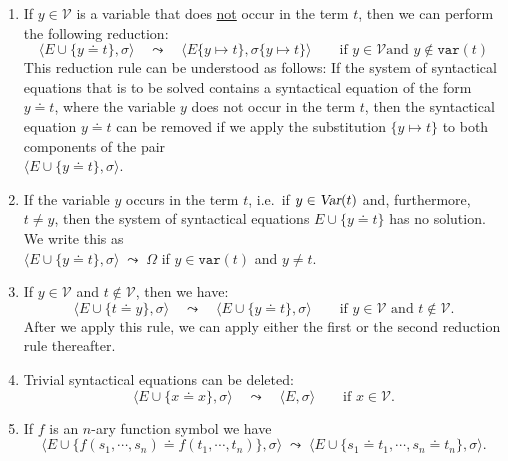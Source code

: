\begin{enumerate}
\item If  $y\in\mathcal{V}$ is a variable that does  \underline{\color{red}not} occur in the term $t$, then
      we can perform the following reduction: 
      \[ \Big\langle E \cup \big\{ y \doteq t \big\}, \sigma \Big\rangle \quad\leadsto\quad 
         \Big\langle E\{y \mapsto t\}, \sigma\{ y \mapsto t \} \Big\rangle \qquad\mbox{if $y \in \mathcal{V}$
           and $y \not\in \mathtt{var}(t)$} 
      \]
      This reduction rule can be understood as follows: If the system of syntactical equations that is to be
      solved contains a syntactical equation of the form $y \doteq t$, where the variable $y$ does not occur in
      the term $t$, then the syntactical equation $y \doteq t$ can be removed if we apply the substitution
      $\{ y \mapsto t \}$ to both components of the pair
      \\[0.2cm]
      \hspace*{1.3cm}
      $\Big\langle E \cup \big\{ y \doteq t \big\}, \sigma \Big\rangle$.
\item If the variable $y$ occurs in the term $t$, i.e.~if  $y \in \textsl{Var}(t)$
      and, furthermore, $t \not= y$, then the system of syntactical equations
      $E \cup \big\{ y \doteq t \big\}$ has no solution.  We write this as
      \\[0.2cm]
      \hspace*{1.3cm}
      $\Big\langle E \cup \big\{ y \doteq t \big\}, \sigma \Big\rangle\;\leadsto\; \Omega$ \quad
      if $y \in \texttt{var}(t)$ and $y \not=t$.
\item If $y\in\mathcal{V}$ and  $t \not\in \mathcal{V}$, then we have:
      \[ \Big\langle E \cup \big\{ t \doteq y \big\}, \sigma \Big\rangle \quad\leadsto\quad 
         \Big\langle E \cup \big\{ y \doteq t \big\}, \sigma \Big\rangle \qquad\mbox{if $y \in \mathcal{V}$ and
           $t \not\in \mathcal{V}$.}
      \]   
      After we apply this rule, we can apply either the first or the second reduction rule thereafter.
\item Trivial syntactical equations can be deleted:
      \[ \Big\langle E \cup \big\{ x \doteq x \big\}, \sigma \Big\rangle \quad\leadsto\quad
         \Big\langle E, \sigma \Big\rangle \qquad\mbox{if $x \in \mathcal{V}$.}
      \]   
\item If $f$ is an  $n$-ary function symbol we have 
      \[ \Big\langle E \cup \big\{ f(s_1,\cdots,s_n) \doteq f(t_1,\cdots,t_n) \big\}, \sigma \Big\rangle 
         \;\leadsto\; 
         \Big\langle E \cup \big\{ s_1 \doteq t_1, \cdots, s_n \doteq t_n\}, \sigma \Big\rangle.
      \]   


\end{enumerate}
